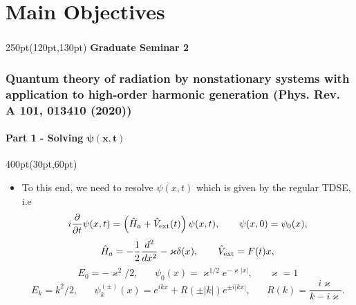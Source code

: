 \section{Main Objectives}


\begin{frame}
\frametitle{}
	\framesubtitle{}

\begin{textblock*}{250pt}(120pt,130pt)
\Huge
\textbf{Graduate Seminar 2}
\end{textblock*}

\end{frame}





\begin{frame}
\frametitle{Quantum theory of radiation by nonstationary systems 
	with application to high-order harmonic generation
        (Phys. Rev. A 101, 013410 (2020))}
        \framesubtitle{Part 1 - Solving $\boldsymbol{\psi(x,t)}$}
\footnotesize
\begin{textblock*}{400pt}(30pt,60pt)
\begin{itemize}
\item To this end, we need to resolve $\psi(x,t)$ 
which is given by the regular TDSE, i.e 
\begin{equation}
	i\frac{\partial}{\partial t}\psi(x,t)
	   = \left( \hat{H}_a + \hat{V}_{\rm ext}(t)\right) 
	   \psi(x,t),   \hspace{20pt}\psi(x,0)=\psi_0(x),  \label{eqn:step_1d}
\end{equation}
\begin{equation}
  \hat{H}_a = -\frac{1}{2}\frac{d^2}{dx^2} - \varkappa\delta(x), \hspace{20pt}
  \hat{V}_{\rm ext} = F(t)x,
\end{equation}
\begin{equation}
  E_0 = -\varkappa^2/2,\hspace{20pt}
  \psi_{0}(x) = \varkappa^{1/2}e^{-\varkappa|x|}, \hspace{20pt}
  \varkappa = 1       \label{eqn:bound_state}
\end{equation}
\begin{equation}
  E_k = k^2/2,\hspace{20pt}
  \psi_k^{(\pm)}(x) = e^{ikx} + R(\pm|k|)e^{\pm i|kx|}, \hspace{20pt}
   R(k) = \frac{i\varkappa}{k-i \varkappa}. \label{eqn:inout_states}
\end{equation}
\vspace{10pt}

\end{itemize}
\end{textblock*}
\end{frame}
